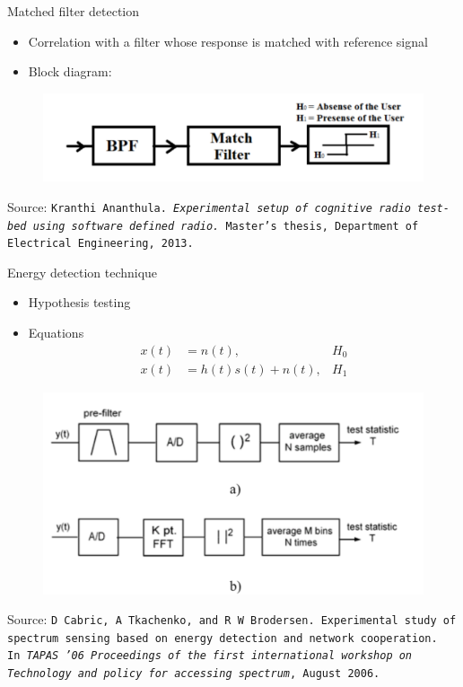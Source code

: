 \documentclass{beamer}
\begin{document}
  \begin{frame}{Matched filter detection}
    \begin{minipage}[t][0.8\textheight][t]{\textwidth}
      \begin{itemize}
	\item Correlation with a filter whose response is matched with reference signal
	\item Block diagram:
      \end{itemize}
      \begin{figure}
	\centering
	\includegraphics[width=0.97\linewidth]{img/matchedFilter}
      \end{figure}
      \vfill
      \tiny{Source: \texttt{Kranthi Ananthula. \emph{Experimental setup of cognitive radio test-bed using software
defined radio.} Master's thesis, Department of Electrical Engineering, 2013.}}
   \end{minipage}
  \end{frame}

   \begin{frame}{Energy detection technique}
    \begin{minipage}[t][0.8\textheight][t]{\textwidth}
      \begin{itemize}
        \item Hypothesis testing
        \item Equations
          \begin{align}
            x(t) &= n(t), & H_0 \nonumber \\
            x(t) &= h(t)s(t) + n(t), & H_1 \nonumber
          \end{align}
      \end{itemize}
     \begin{figure}
        \centering
        \includegraphics[width=0.59\linewidth]{img/energyDetection}
      \end{figure}
      \tiny{Source: \texttt{D Cabric, A Tkachenko, and R W Brodersen.
      Experimental study of spectrum sensing based on energy detection and network cooperation.\\
      In \emph{TAPAS ’06 Proceedings
of the first international workshop on Technology and policy for accessing spectrum},
August 2006.}}
    \end{minipage}
  \end{frame}
\end{document}
